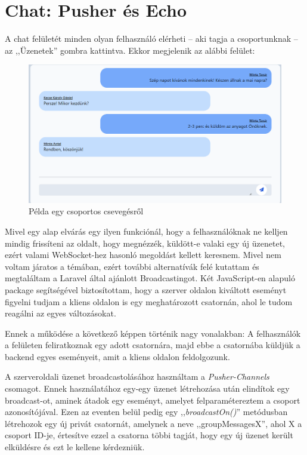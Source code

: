 \documentclass[
]{thesis-ekf}
\theoremstyle{definition}
\theoremstyle{remark}
\begin{document}
            \section{Chat: Pusher és Echo}    
                A chat felületét minden olyan felhasználó elérheti -- aki tagja a csoportunknak -- az ,,Üzenetek'' gombra kattintva. Ekkor megjelenik az alábbi felület:
                \begin{figure}[ht!]
    		    \centering
    		    \includegraphics[width=15cm]{Group.chat.png}
                    \caption{Példa egy csoportos csevegésről}
    		    \label{fig-csoportok-chat}
    	    \end{figure}

                Mivel egy alap elvárás egy ilyen funkciónál, hogy a felhasználóknak ne kelljen mindig frissíteni az oldalt, hogy megnézzék, küldött-e valaki egy új üzenetet, ezért valami WebSocket-hez hasonló megoldást kellett keresnem. Mivel nem voltam járatos a témában, ezért további alternatívák felé kutattam és megtaláltam a Laravel által ajánlott Broadcastingot. Két JavaScript-en alapuló package segítségével biztosítottam, hogy a szerver oldalon kiváltott eseményt figyelni tudjam a kliens oldalon is egy meghatározott csatornán, ahol le tudom reagálni az egyes változásokat. 

                Ennek a működése a következő képpen történik nagy vonalakban:
                A felhasználók a felületen feliratkoznak egy adott csatornára, majd ebbe a csatornába küldjük a backend egyes eseményeit, amit a kliens oldalon feldolgozunk. 

                A szerveroldali üzenet broadcastolásához használtam a \emph{Pusher-Channels}\cite{Pusher-Channels} csomagot. Ennek használatához egy-egy üzenet létrehozása után elindítok egy broadcast-ot, aminek átadok egy eseményt, amelyet felparamétereztem a csoport azonosítójával. Ezen az eventen belül pedig egy ,,\emph{broadcastOn()}'' metódusban létrehozok egy új privát csatornát, amelynek a neve ,,groupMessagesX'', ahol X a csoport ID-je, értesítve ezzel a csatorna többi tagját, hogy egy új üzenet került elküldésre és ezt le kellene kérdezniük.
\end{document}
